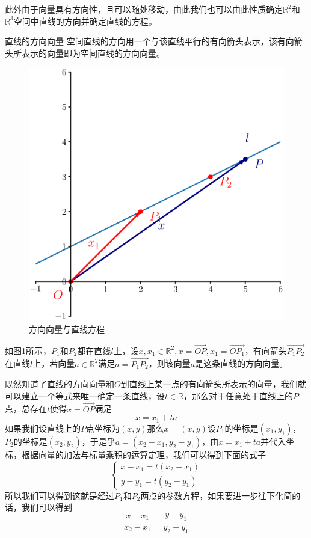 此外由于向量具有方向性，且可以随处移动，由此我们也可以由此性质确定$\mathbb{R}^2$和$\mathbb{R}^3$空间中直线的方向并确定直线的方程。

\begin{definition}{直线的方向向量}
	空间直线的方向用一个与该直线平行的有向箭头表示，该有向箭头所表示的向量即为空间直线的方向向量。
\end{definition}

\begin{figure}[htbp]
	\centering
	\includegraphics[width=0.7\linewidth]{figure/eps/LineAndVector2d}
	\caption{方向向量与直线方程}
	\label{fig:lineandvector2d}
\end{figure}

如图\ref{fig:lineandvector2d}所示，$P_1$和$P_2$都在直线$l$上，设$x,x_1\in \mathbb{R}^2,x=\overrightarrow{OP},x_1=\overrightarrow{OP_1}$，有向箭头$\overrightarrow{P_1P_2}$在直线$l$上，若向量$a\in \mathbb{R}^2$满足$a=\overrightarrow{P_1P_2}$，则该向量$a$是这条直线的方向向量。

既然知道了直线的方向向量和$O$到直线上某一点的有向箭头所表示的向量，我们就可以建立一个等式来唯一确定一条直线，设$t\in \mathbb{R}$，那么对于任意处于直线上的$P$点，总存在$t$使得$x=\overrightarrow{OP}$满足$$x=x_1+ta$$如果我们设直线上的$P$点坐标为$(x,y)$那么$x=(x,y)$设$P_1$的坐标是$(x_1,y_1)$，$P_2$的坐标是$(x_2,y_2)$，于是乎$a=(x_2-x_1,y_2-y_1)$，由$x=x_1+ta$并代入坐标，根据向量的加法与标量乘积的运算定理，我们可以得到下面的式子$$\left\{\begin{matrix} 
	x-x_1=t(x_2-x_1) \\  
	y-y_1=t(y_2-y_1)
\end{matrix}\right. $$所以我们可以得到这就是经过$P_1$和$P_2$两点的参数方程，如果要进一步往下化简的话，我们可以得到$$\frac{x-x_1}{x_2-x_1}=\frac{y-y_1}{y_2-y_1}$$

